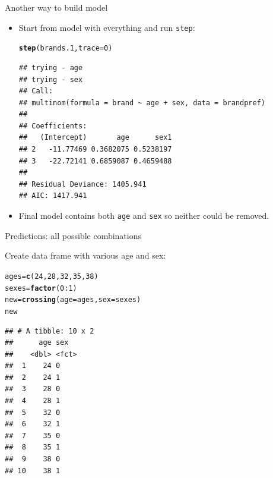 \documentclass[unknownkeysallowed]{beamer}\usepackage[]{graphicx}\usepackage[]{color}
\makeatletter
\newcommand{\hlnum}[1]{\textcolor[rgb]{0.686,0.059,0.569}{#1}}%
\newcommand{\hlopt}[1]{\textcolor[rgb]{0,0,0}{#1}}%
\newcommand{\hlstd}[1]{\textcolor[rgb]{0.345,0.345,0.345}{#1}}%
\newcommand{\hlkwb}[1]{\textcolor[rgb]{0.69,0.353,0.396}{#1}}%
\newcommand{\hlkwc}[1]{\textcolor[rgb]{0.333,0.667,0.333}{#1}}%
\newcommand{\hlkwd}[1]{\textcolor[rgb]{0.737,0.353,0.396}{\textbf{#1}}}%
\newenvironment{kframe}{%
 \def\at@end@of@kframe{}%
 \ifinner\ifhmode%
  \def\at@end@of@kframe{\end{minipage}}%
  \begin{minipage}{\columnwidth}%
 \fi\fi%
 \def\FrameCommand##1{\hskip\@totalleftmargin \hskip-\fboxsep
 \colorbox{shadecolor}{##1}\hskip-\fboxsep
     \hskip-\linewidth \hskip-\@totalleftmargin \hskip\columnwidth}%
 \MakeFramed {\advance\hsize-\width
   \@totalleftmargin\z@ \linewidth\hsize
   \@setminipage}}%
 {\par\unskip\endMakeFramed%
 \at@end@of@kframe}
\newenvironment{knitrout}{}{} %
\makeatother
\begin{document}
\begin{frame}[fragile]{Another way to build model}
  
  \begin{itemize}
  \item Start from model with everything and run \texttt{step}:
    
\begin{knitrout}
\color{fgcolor}\begin{kframe}
\begin{alltt}
\hlkwd{step}\hlstd{(brands.1,}\hlkwc{trace}\hlstd{=}\hlnum{0}\hlstd{)}
\end{alltt}
\begin{verbatim}
## trying - age 
## trying - sex
## Call:
## multinom(formula = brand ~ age + sex, data = brandpref)
## 
## Coefficients:
##   (Intercept)       age      sex1
## 2   -11.77469 0.3682075 0.5238197
## 3   -22.72141 0.6859087 0.4659488
## 
## Residual Deviance: 1405.941 
## AIC: 1417.941
\end{verbatim}
\end{kframe}
\end{knitrout}


\item Final model contains both \texttt{age} and \texttt{sex} so neither
could be removed.
  \end{itemize}
  
\end{frame}

\begin{frame}[fragile]{Predictions: all possible combinations}

Create data frame with various age and sex:

\begin{knitrout}\footnotesize
{}\color{fgcolor}\begin{kframe}
\begin{alltt}
\hlstd{ages}\hlkwb{=}\hlkwd{c}\hlstd{(}\hlnum{24}\hlstd{,}\hlnum{28}\hlstd{,}\hlnum{32}\hlstd{,}\hlnum{35}\hlstd{,}\hlnum{38}\hlstd{)}
\hlstd{sexes}\hlkwb{=}\hlkwd{factor}\hlstd{(}\hlnum{0}\hlopt{:}\hlnum{1}\hlstd{)}
\hlstd{new}\hlkwb{=}\hlkwd{crossing}\hlstd{(}\hlkwc{age}\hlstd{=ages,}\hlkwc{sex}\hlstd{=sexes)}
\hlstd{new}
\end{alltt}
\begin{verbatim}
## # A tibble: 10 x 2
##      age sex  
##    <dbl> <fct>
##  1    24 0    
##  2    24 1    
##  3    28 0    
##  4    28 1    
##  5    32 0    
##  6    32 1    
##  7    35 0    
##  8    35 1    
##  9    38 0    
## 10    38 1
\end{verbatim}
\end{kframe}
\end{knitrout}

\end{frame}
\end{document}
